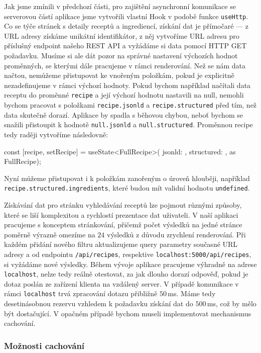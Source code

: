 Jak jsme zmínili v předchozí části, pro zajištění asynchronní komunikace se serverovou částí aplikace jsme vytvořili vlastní Hook v podobě funkce \texttt{useHttp}. Co se týče stránek s detaily receptů a ingrediencí, získání dat je přímočaré --- z URL adresy získáme unikátní identifikátor, z něj vytvoříme URL adresu pro příslušný endpoint našeho REST API a vyžádáme si data pomocí HTTP GET požadavku. Musíme si ale dát pozor na správné nastavení výchozích hodnot proměnných, se kterými dále pracujeme v rámci renderování. Než se nám data načtou, nemůžeme přistupovat ke vnořeným položkám, pokud je explicitně nezadefinujeme v rámci výchozí hodnoty. Pokud bychom například načítali data receptu do proměnné \texttt{recipe} a její výchozí hodnotu nastavili na null, nemohli bychom pracovat s položkami \texttt{recipe.jsonld} a \texttt{recipe.structured} před tím, než data skutečně dorazí. Aplikace by spadla s běhovou chybou, neboť bychom se snažili přistoupit k hodnotě \texttt{null.jsonld} a \texttt{null.structured}. Proměnnou recipe tedy raději vytvoříme následovně:
\begingroup
\samepage
\begin{code}
const [recipe, setRecipe] = useState<FullRecipe>({
  jsonld: {},
  structured: {},
} as FullRecipe);
\end{code}
Nyní můžeme přistupovat i k položkám zanořeným o úroveň hlouběji, například \texttt{recipe.structured.ingredients}, které budou mít validní hodnotu \texttt{undefined}.
\endgroup

Získávání dat pro stránku vyhledávání receptů lze pojmout různými způsoby, které se liší komplexitou a rychlostí prezentace dat uživateli. V naší aplikaci pracujeme s konceptem stránkování, přičemž počet výsledků na jedné stránce poměrně výrazně omezíme na $24$ výsledků z důvodu zrychlení renderování. Při každém přidání nového filtru aktualizujeme query parametry současné URL adresy a od endpointu \texttt{/api/recipes}, respektive \texttt{localhost:5000/api/recipes}, si vyžádáme nové výsledky. Během vývoje aplikace pracujeme výhradně na adrese \texttt{localhost}, nelze tedy reálně otestovat, za jak dlouho dorazí odpověď, pokud je dotaz poslán ze zařízení klienta na vzdálený server. V případě komunikace v rámci \texttt{localhost} trvá zpracování dotazu přibližně $50\,$ms. Máme tedy desetinásobnou rezervu vzhledem k požadavku získání dat do $500\,$ms, což by mělo být dostačující. V opačném případě bychom museli implementovat mechanismus cachování.

\subsubsection{Možnosti cachování}

